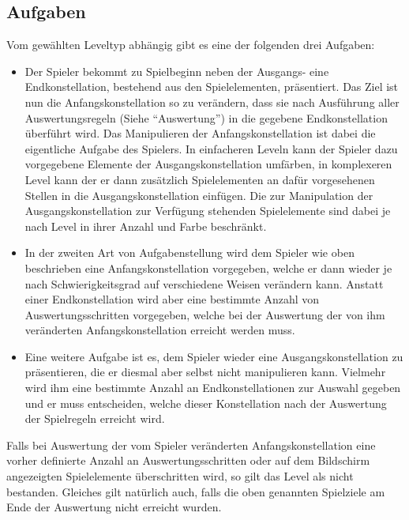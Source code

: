 \subsection{Aufgaben}
Vom gewählten Leveltyp abhängig gibt es eine der folgenden drei Aufgaben:
        \begin{itemize}
                \item Der Spieler bekommt zu Spielbeginn neben der Ausgangs- eine Endkonstellation, bestehend aus den Spielelementen, präsentiert.
                Das Ziel ist nun die Anfangskonstellation so zu verändern, dass sie nach Ausführung aller Auswertungsregeln (Siehe "`Auswertung"') in die gegebene Endkonstellation überführt wird.
                Das Manipulieren der Anfangskonstellation ist dabei die eigentliche Aufgabe des Spielers.
                In einfacheren Leveln kann der Spieler dazu vorgegebene Elemente der Ausgangskonstellation umfärben, in komplexeren Level kann der er dann zusätzlich Spielelementen an dafür vorgesehenen Stellen in die Ausgangskonstellation einfügen. 
                Die zur Manipulation der Ausgangskonstellation zur Verfügung stehenden Spielelemente sind dabei je nach Level in ihrer Anzahl und Farbe beschränkt.

                \item In der zweiten Art von Aufgabenstellung wird dem Spieler wie oben beschrieben eine Anfangskonstellation vorgegeben, welche er dann wieder je nach Schwierigkeitsgrad auf verschiedene Weisen verändern kann.
                Anstatt einer Endkonstellation wird aber eine bestimmte Anzahl von Auswertungsschritten vorgegeben, welche bei der Auswertung der von ihm veränderten Anfangskonstellation erreicht werden muss.

                \item Eine weitere Aufgabe ist es, dem Spieler wieder eine Ausgangskonstellation zu präsentieren, die er diesmal aber selbst nicht manipulieren kann. 
                Vielmehr wird ihm eine bestimmte Anzahl an Endkonstellationen zur Auswahl gegeben und er muss entscheiden, welche dieser Konstellation nach der Auswertung der Spielregeln erreicht wird.

        \end{itemize}

        Falls bei Auswertung der vom Spieler veränderten Anfangskonstellation eine vorher definierte Anzahl an Auswertungsschritten oder auf dem Bildschirm angezeigten Spielelemente überschritten wird, so gilt das Level als nicht bestanden. 
        Gleiches gilt natürlich auch, falls die oben genannten Spielziele am Ende der Auswertung nicht erreicht wurden.
        
